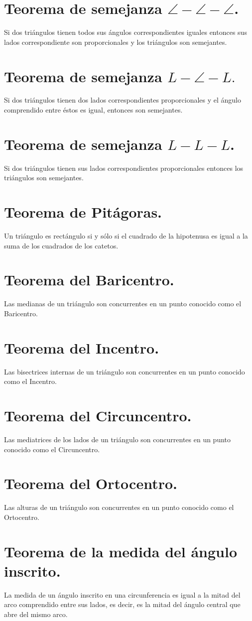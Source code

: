 \documentclass[12pt,a4paper,oneside]{book}
\begin{document}
\section{Teorema de semejanza $\angle -\angle -\angle$.}
Si dos triángulos tienen todos sus ángulos correspondientes iguales entonces sus lados correspondiente son proporcionales y los triángulos son semejantes.
\section{Teorema de semejanza $L-\angle - L.$}
Si dos triángulos tienen dos lados correspondientes proporcionales y el ángulo comprendido entre éstos es igual, entonces son semejantes.
\section{Teorema de semejanza $L-L-L$.}
Si dos triángulos tienen sus lados correspondientes proporcionales entonces los triángulos son semejantes.
\section{Teorema de Pitágoras.}
Un triángulo es rectángulo si y sólo si el cuadrado de la hipotenusa es igual a la suma de los cuadrados de los catetos.
\section{Teorema del Baricentro.}
Las medianas de un triángulo son concurrentes en un punto conocido como el Baricentro.
\section{Teorema del Incentro.}
Las bisectrices internas de un triángulo son concurrentes en un punto conocido como el Incentro.
\section{Teorema del Circuncentro.}
Las mediatrices de los lados de un triángulo son concurrentes en un punto conocido como el Circuncentro.
\section{Teorema del Ortocentro.}
Las alturas de un triángulo son concurrentes en un punto conocido como el Ortocentro.
\section{Teorema de la medida del ángulo inscrito.}
La medida de un ángulo inscrito en una circunferencia es igual a la mitad del arco comprendido entre sus lados, es decir, es la mitad del ángulo central que abre del mismo arco.
\end{document}
